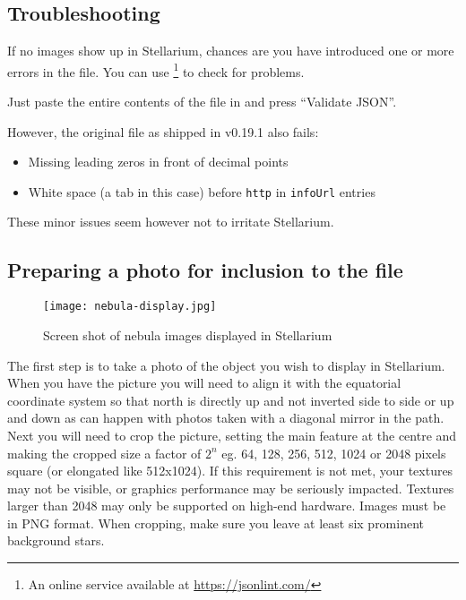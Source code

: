 \subsection{Troubleshooting}


If no images show up in Stellarium, chances are you have introduced
one or more errors in the  file.  You can use
 \footnote{An online service available at
  \url{https://jsonlint.com/}} to check for problems.

Just paste the entire contents of the file in and press ``Validate JSON''.

However, the original   file as shipped in v0.19.1 also fails:
\begin{itemize}
\item Missing leading zeros in front of decimal points
\item White space (a tab in this case) before \texttt{http} in \texttt{infoUrl} entries
\end{itemize}
These minor issues seem however not to irritate Stellarium.


\iffalse 
{}

\subsection{Preparing a photo for inclusion to the \texorpdfstring{ file}{textures.json file}}
\label{sec:dso:preparing-a-photo}

\begin{figure}[h]
\centering\texttt{[image: nebula-display.jpg]}
\caption{Screen shot of nebula images displayed in Stellarium}
\label{fig:dso:preparing-a-photo}
\end{figure}

The first step is to take a photo of the object you wish to display in
Stellarium. When you have the picture you will need to align it with
the equatorial coordinate system so that north is directly up and not
inverted side to side or up and down as can happen with photos taken
with a diagonal mirror in the path. Next you will need to crop the
picture, setting the main feature at the centre and making the cropped
size a factor of $2^n$ eg. 64, 128, 256, 512, 1024 or 2048 pixels
square (or elongated like 512x1024).  If this requirement is not met,
your textures may not be visible, or graphics performance may be
seriously impacted. Textures larger than 2048 may only be supported on
high-end hardware. Images must be in PNG format.  When cropping, make
sure you leave at least six prominent background stars.

